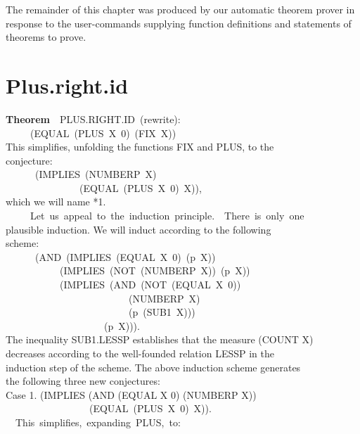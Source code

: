 \documentclass[10pt]{book}
\newenvironment{pubasis}{\begin{flushleft}}{\end{flushleft}}
\newcommand{\axiomordefinition}[1]{\vspace{6pt}\Large\textsf{\textbf{#1}}\normalsize}
\begin{document}
The remainder of this chapter was produced by our automatic
theorem prover in response to the user-commands supplying
function definitions and statements of theorems to prove.

\section{Plus.right.id}
\begin{pubasis}
\axiomordefinition{Theorem}~~PLUS.RIGHT.ID~(rewrite):\\
~~~~~(EQUAL~(PLUS~X~0)~(FIX~X))\\

This simplifies, unfolding the functions FIX and PLUS, to the\\
conjecture:\\

~~~~~~(IMPLIES~(NUMBERP~X)\\
~~~~~~~~~~~~~~~(EQUAL~(PLUS~X~0)~X)),\\

which we will name *1.\\

~~~~~Let~us~appeal~to~the~induction~principle.~~There~is~only~one\\
plausible induction.  We will induct according to the following\\
scheme:\\
~~~~~~(AND~(IMPLIES~(EQUAL~X~0)~(p~X))\\
~~~~~~~~~~~(IMPLIES~(NOT~(NUMBERP~X))~(p~X))\\
~~~~~~~~~~~(IMPLIES~(AND~(NOT~(EQUAL~X~0))\\
~~~~~~~~~~~~~~~~~~~~~~~~~(NUMBERP~X)\\
~~~~~~~~~~~~~~~~~~~~~~~~~(p~(SUB1~X)))\\
~~~~~~~~~~~~~~~~~~~~(p~X))).\\
The inequality SUB1.LESSP establishes that the measure (COUNT X)\\
decreases according to the well-founded relation LESSP in the\\
induction step of the scheme.  The above induction scheme generates\\
the following three new conjectures:\\

Case 1.	(IMPLIES (AND (EQUAL X 0) (NUMBERP X))\\
~~~~~~~~~~~~~~~~~(EQUAL~(PLUS~X~0)~X)).\\

~~This~simplifies,~expanding~PLUS,~to:\\


\end{pubasis}
\end{document}
